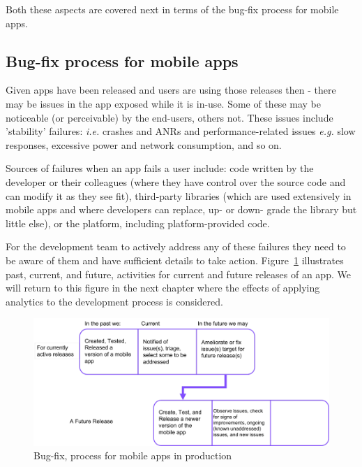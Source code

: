 Both these aspects are covered next in terms of the bug-fix process for mobile apps.

\subsection{Bug-fix process for mobile apps}

Given apps have been released and users are using those releases then - there may be issues in the app exposed while it is in-use. Some of these may be noticeable (or perceivable) by the end-users, others not. These issues include 'stability' failures: \textit{i.e.} crashes and ANRs and performance-related issues \textit{e.g.} slow responses, excessive power and network consumption, and so on.

Sources of failures when an app fails a user include: code written by the developer or their colleagues (where they have control over the source code and can modify it as they see fit), third-party libraries (which are used extensively in mobile apps and where developers can replace, up- or down- grade the library but little else), or the platform, including platform-provided code.

For the development team to actively address any of these failures they need to be aware of them and have sufficient details to take action. Figure~\ref{fig:my:bug-fix-process-for-mobile-apps-in-prod} illustrates past, current, and future, activities for current and future releases of an app. We will return to this figure %
in the next chapter where the effects of applying analytics to the development process is considered.

\begin{figure} %
    \includegraphics[width=\linewidth]{images/my/production-bug-fix-process-for-mobile-apps.pdf}
    \caption{Bug-fix, process for mobile apps in production}
    \label{fig:my:bug-fix-process-for-mobile-apps-in-prod}
\end{figure}


